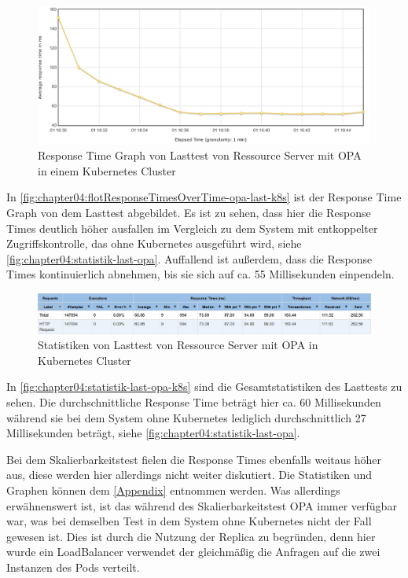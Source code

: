 \begin{figure}[H]
  \centering
  \includegraphics[width=1.0\textwidth]{gfx/flotResponseTimesOverTime-opa-last-k8s.png}
  \caption{Response Time Graph von Lasttest von Ressource Server mit OPA in einem Kubernetes Cluster}
  \label{fig:chapter04:flotResponseTimesOverTime-opa-last-k8s}
\end{figure}

In \autoref{fig:chapter04:flotResponseTimesOverTime-opa-last-k8s} ist der Response Time Graph von dem Lasttest abgebildet. Es ist zu sehen, dass hier die Response Times deutlich höher ausfallen im Vergleich zu dem System mit entkoppelter Zugriffskontrolle, das ohne Kubernetes ausgeführt wird, siehe \autoref{fig:chapter04:statistik-last-opa}. Auffallend ist außerdem, dass die Response Times kontinuierlich abnehmen, bis sie sich auf ca. 55 Millisekunden einpendeln. 

\begin{figure}[H]
  \centering
  \includegraphics[width=1.0\textwidth]{gfx/statistik-last-opa-k8s.png}
  \caption{Statistiken von Lasttest von Ressource Server mit OPA in Kubernetes Cluster}
  \label{fig:chapter04:statistik-last-opa-k8s}
\end{figure}

In \autoref{fig:chapter04:statistik-last-opa-k8s} sind die Gesamtstatistiken des Lasttests zu sehen. Die durchschnittliche Response Time beträgt hier ca. 60 Millisekunden während sie bei dem System ohne Kubernetes lediglich durchschnittlich 27 Millisekunden beträgt, siehe \autoref{fig:chapter04:statistik-last-opa}.\smallskip

Bei dem Skalierbarkeitstest fielen die Response Times ebenfalls weitaus höher aus, diese werden hier allerdings nicht weiter diskutiert. Die Statistiken und Graphen können dem \autoref{Appendix} entnommen werden. Was allerdings erwähnenswert ist, ist das während des Skalierbarkeitstest OPA immer verfügbar war, was bei demselben Test in dem System ohne Kubernetes nicht der Fall gewesen ist. Dies ist durch die Nutzung der Replica zu begründen, denn hier wurde ein LoadBalancer verwendet der gleichmäßig die Anfragen auf die zwei Instanzen des Pods verteilt. 

